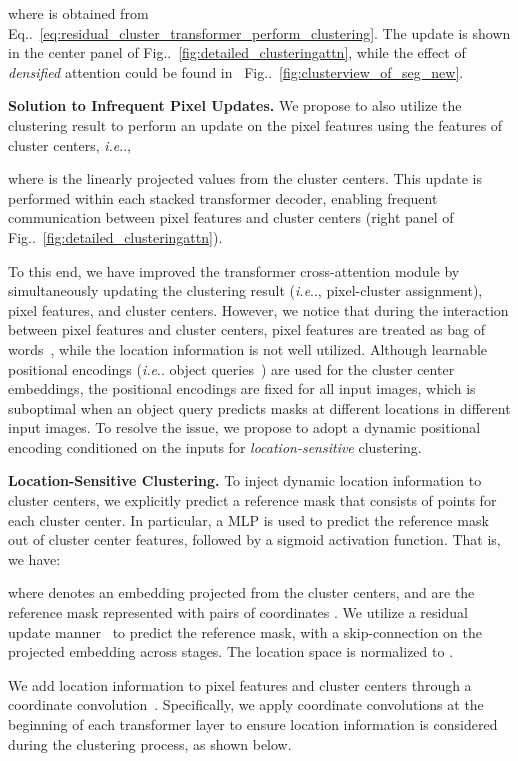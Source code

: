 \documentclass[10pt,twocolumn,letterpaper]{article}
\makeatletter
\DeclareRobustCommand\onedot{\futurelet\@let@token\@onedot}
\def\@onedot{\ifx\@let@token.\else.\null\fi\xspace}
\def\ie{\emph{i.e}\onedot} \def\Ie{\emph{I.e}\onedot}
\newcommand{\figref}[1]{Fig\onedot~\ref{#1}}
\newcommand{\equref}[1]{Eq\onedot~\eqref{#1}}
\makeatother
\begin{document}
where  is obtained from \equref{eq:residual_cluster_transformer_perform_clustering}. The update is shown in the center panel of \figref{fig:detailed_clusteringattn}, while the effect of {\it densified} attention could be found in ~\figref{fig:clusterview_of_seg_new}.

\vspace{0.5ex}
\noindent\textbf{Solution to Infrequent Pixel Updates.} We propose to also utilize the clustering result  to perform an update on the pixel features using the features of cluster centers, \ie,

where  is the linearly projected values from the cluster centers. This update is performed within each stacked transformer decoder, enabling frequent communication between pixel features and cluster centers (right panel of \figref{fig:detailed_clusteringattn}).


To this end, we have improved the transformer cross-attention module by simultaneously updating the clustering result (\ie, pixel-cluster assignment), pixel features, and cluster centers. However, we notice that during the interaction between pixel features and cluster centers, pixel features are treated as bag of words~\cite{lazebnik2006beyond}, while the location information is not well utilized. Although learnable positional encodings (\ie object queries~\cite{carion2020end}) are used for the cluster center embeddings, the positional encodings are fixed for all input images, which is suboptimal when an object query predicts masks at different locations in different input images. To resolve the issue, we propose to adopt a dynamic positional encoding conditioned on the inputs for {\it location-sensitive} clustering.

\vspace{0.5ex}
\noindent\textbf{Location-Sensitive Clustering.} To inject dynamic location information to cluster centers, we explicitly predict a reference mask that consists of  points for each cluster center. In particular, a MLP is used to predict the reference mask out of cluster center features, followed by a sigmoid activation function. That is, we have:

where  denotes an embedding projected from the cluster centers, and  are the reference mask represented with  pairs of coordinates . We utilize a residual update manner~\cite{he2016deep,zhu2020deformable} to predict the reference mask, with a skip-connection on the projected embedding  across stages. The location space is normalized to .

We add location information to pixel features and cluster centers through a coordinate convolution~\cite{liu2018intriguing}. Specifically, we apply coordinate convolutions at the beginning of each transformer layer to ensure location information is considered during the clustering process, as shown below.
\end{document}
